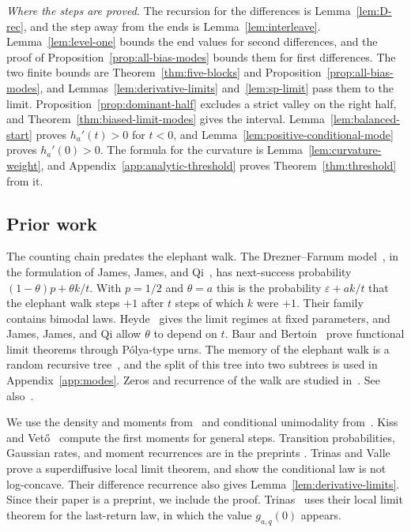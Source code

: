 \emph{Where the steps are proved.} The recursion for the differences is
Lemma~\ref{lem:D-rec}, and the step away from the ends is
Lemma~\ref{lem:interleave}. Lemma~\ref{lem:level-one} bounds the end
values for second differences, and the proof of
Proposition~\ref{prop:all-bias-modes} bounds them for first differences.
The two finite bounds are Theorem~\ref{thm:five-blocks} and
Proposition~\ref{prop:all-bias-modes}, and
Lemmas~\ref{lem:derivative-limits} and~\ref{lem:sp-limit} pass them
to the limit.
Proposition~\ref{prop:dominant-half} excludes a strict valley on the
right half, and Theorem~\ref{thm:biased-limit-modes} gives the interval.
Lemma~\ref{lem:balanced-start} proves $h_a'(t)>0$ for $t<0$, and
Lemma~\ref{lem:positive-conditional-mode} proves $h_a'(0)>0$. The
formula for the curvature is Lemma~\ref{lem:curvature-weight}, and
Appendix~\ref{app:analytic-threshold} proves
Theorem~\ref{thm:threshold} from it.

\subsection{Prior work}\label{sec:prior}

The counting chain predates the elephant walk. The Drezner--Farnum
model~\cite{dreznerfarnum1993}, in the formulation of
James, James, and Qi~\cite[p.~2339]{jamesjamesqi2008}, has
next-success probability $(1-\theta)p+\theta k/t$.
With $p=1/2$ and $\theta=a$ this is the probability
$\varepsilon+ak/t$ that the elephant walk steps $+1$ after $t$ steps
of which $k$ were $+1$. Their family contains
bimodal laws. Heyde~\cite{heyde2004} gives the limit regimes at fixed
parameters, and James, James, and Qi allow $\theta$ to depend on $t$.
Baur and Bertoin~\cite{baurbert2016} prove functional limit theorems
through P\'olya-type urns. The memory of the elephant walk is a random recursive
tree~\cite{kursten2016}, and the split of this tree into two subtrees
is used in Appendix~\ref{app:modes}. Zeros and recurrence of the walk
are studied in~\cite{bertoin2022,qin2025}. See
also~\cite{coletti2017,bercu2018,kubotatakei2019}.

We use the density and moments from~\cite[Theorems~1.3 and~1.4]{glr2026}
and conditional unimodality from~\cite[Theorem~1.1]{glrs2025}. Kiss
and Vet\H{o}~\cite{kissveto2022} compute the first moments for
general steps. Transition probabilities, Gaussian rates, and moment
recurrences are in the preprints
\cite{peresqin2026,muraharatokumitsu2026,vishwakarma2026}.
Trinas and Valle~\cite{tv2026} prove a superdiffusive local limit
theorem, and show the conditional law is not log-concave. Their
difference recurrence also gives Lemma~\ref{lem:derivative-limits}.
Since their paper is a preprint, we include the proof. Trinas~\cite{trinas2026}
uses their local limit theorem for the last-return law, in which the
value $g_{a,q}(0)$ appears.
